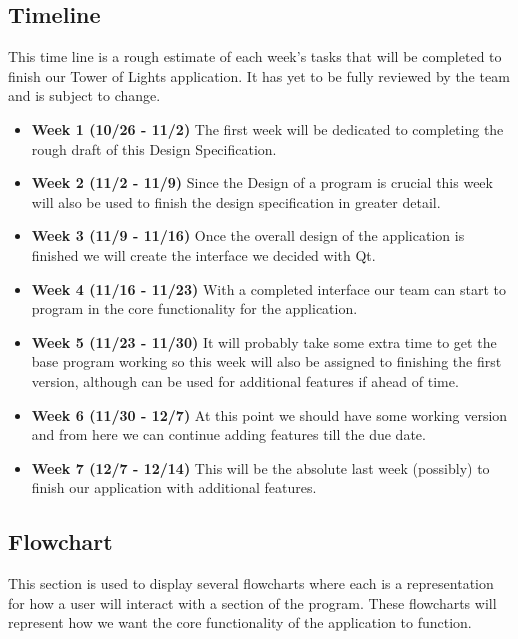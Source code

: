 \documentclass{article}
\begin{document}
\subsection{Timeline}
This time line is a rough estimate of each week's tasks that will be completed to finish our Tower of Lights application. It has yet to be fully reviewed by the team and is subject to change.
	\begin{itemize}
		\item \textbf{Week 1 (10/26 - 11/2)} The first week will be dedicated to completing the rough draft of this Design Specification. 
		\item \textbf{Week 2 (11/2 - 11/9)} Since the Design of a program is crucial this week will also be used to finish the design specification in greater detail.
		\item \textbf{Week 3 (11/9 - 11/16)} Once the overall design of the application is finished we will create the interface we decided with Qt.
		\item \textbf{Week 4 (11/16 - 11/23)} With a completed interface our team can start to program in the core functionality for the application.
		\item \textbf{Week 5 (11/23 - 11/30)} It will probably take some extra time to get the base program working so this week will also be assigned to finishing the first version, although 				can be used for additional features if ahead of time.
		\item \textbf{Week 6 (11/30 - 12/7)} At this point we should have some working version and from here we can continue adding features till the due date.
		\item \textbf{Week 7 (12/7 - 12/14)} This will be the absolute last week (possibly) to finish our application with additional features.
	\end{itemize}
\subsection{Flowchart}
This section is used to display several flowcharts where each is a representation for how a user will interact with a section of the program. These flowcharts will represent how we want the core functionality of the application to function.
\end{document}

